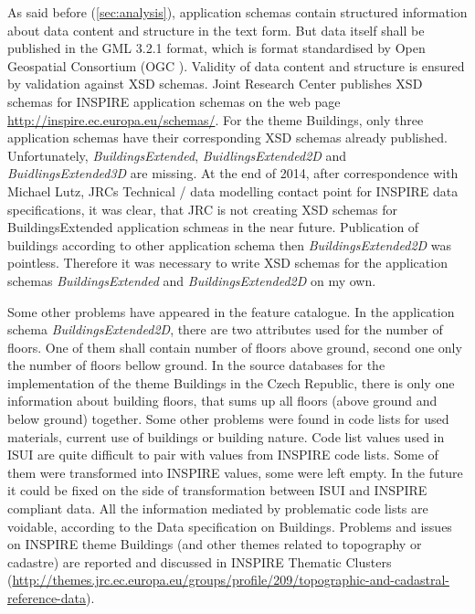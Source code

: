 \documentclass[eprint]{actapoly}
\begin{document}
As said before (\ref{sec:analysis}), application schemas contain structured information about data content and structure in the text form. But data itself shall be published in the GML 3.2.1 format, which is format standardised by Open Geospatial Consortium (OGC \cite{OGC -- http://www.opengeospatial.org}). Validity of data content and structure is ensured by validation against XSD schemas. Joint Research Center publishes XSD schemas for INSPIRE application schemas on the web page \url{http://inspire.ec.europa.eu/schemas/}. For the theme Buildings, only three application schemas have their corresponding XSD schemas already published. Unfortunately, \textit{BuildingsExtended}, \textit{BuidlingsExtended2D} and \textit{BuidlingsExtended3D} are missing. At the end of 2014, after correspondence with Michael Lutz, JRCs Technical / data modelling contact point for INSPIRE data specifications, it was clear, that JRC is not creating XSD schemas for BuildingsExtended application schmeas in the near future. Publication of buildings according to other application schema then \textit{BuildingsExtended2D} was pointless. Therefore it was necessary to write XSD schemas for the application schemas \textit{BuildingsExtended} and \textit{BuildingsExtended2D} on my own.

Some other problems have appeared in the feature catalogue. In the application schema \textit{BuildingsExtended2D}, there are two attributes used for the number of floors. One of them shall contain number of floors above ground, second one only the number of floors bellow ground. In the source databases for the implementation of the theme Buildings in the Czech Republic, there is only one information about building floors, that sums up all floors (above ground and below ground) together. Some other problems were found in code lists for used materials, current use of buildings or building nature. Code list values used in ISUI are quite difficult to pair with values from INSPIRE code lists. Some of them were transformed into INSPIRE values, some were left empty. In the future it could be fixed on the side of transformation between ISUI and INSPIRE compliant data. All the information mediated by problematic code lists are voidable, according to the Data specification on Buildings. Problems and issues on INSPIRE theme Buildings (and other themes related to topography or cadastre) are reported and discussed in INSPIRE Thematic Clusters (\url{http://themes.jrc.ec.europa.eu/groups/profile/209/topographic-and-cadastral-reference-data}).
\end{document}
